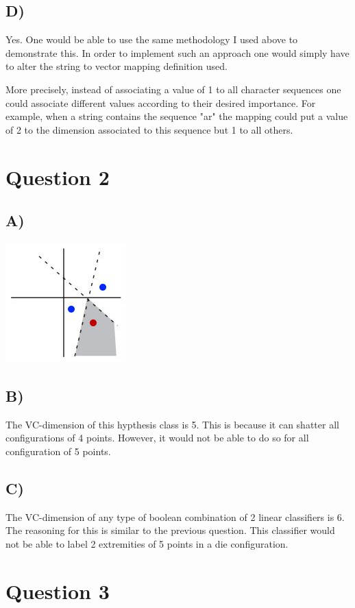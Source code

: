 \documentclass{report}
\begin{document}
\subsection*{D)}
Yes. One would be able to use the same methodology I used above to demonstrate this.
In order to implement such an approach one would simply have to alter the string to vector
mapping definition used.

More precisely, instead of associating a value of 1 to all character
sequences one could associate different values according to their desired importance. For
example, when a string contains the sequence "ar" the mapping could put a value of 2
to the dimension associated to this sequence but 1 to all others.

\section*{Question 2}
\subsection*{A)}
\includegraphics[width=175px, keepaspectratio]{3points.jpg}
\subsection*{B)}
The VC-dimension of this hypthesis class is 5. This is because it can
shatter all configurations of 4 points. However, it would not be able to do so for all
configuration of 5 points.
\subsection*{C)}
The VC-dimension of any type of boolean combination of 2 linear classifiers is
6. The reasoning for this is similar to the previous question. This classifier
would not be able to label 2 extremities of 5 points in a die configuration.

\section*{Question 3}
\end{document}
